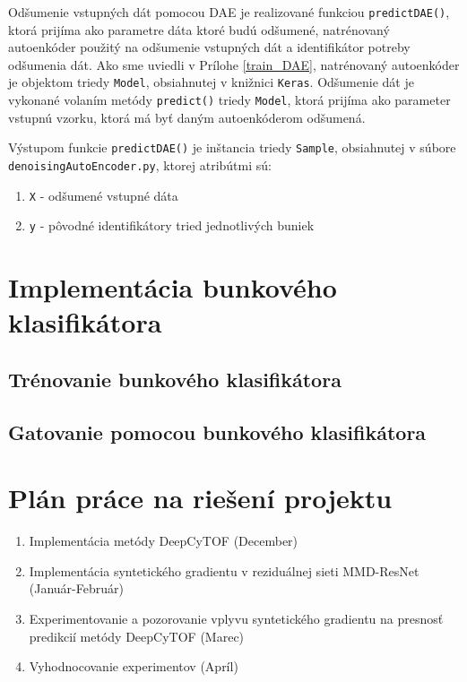 Odšumenie vstupných dát pomocou DAE je realizované funkciou \texttt{predictDAE()}, ktorá prijíma ako parametre dáta ktoré budú odšumené, natrénovaný autoenkóder použitý na odšumenie vstupných dát a identifikátor potreby odšumenia dát. Ako sme uviedli v Prílohe \ref{train_DAE}, natrénovaný autoenkóder je objektom triedy \texttt{Model}, obsiahnutej v knižnici \texttt{Keras}. Odšumenie dát je vykonané volaním metódy \texttt{predict()} triedy \texttt{Model}, ktorá prijíma ako parameter vstupnú vzorku, ktorá má byť daným autoenkóderom odšumená. 

Výstupom funkcie \texttt{predictDAE()} je inštancia triedy \texttt{Sample}, obsiahnutej v súbore \texttt{denoisingAutoEncoder.py}, ktorej atribútmi sú:
\begin{enumerate}
    \item \texttt{X} - odšumené vstupné dáta
    \item \texttt{y} - pôvodné identifikátory tried jednotlivých buniek
\end{enumerate}

\chapter{Implementácia bunkového klasifikátora}
\label{implementation_ff_net}

\section{Trénovanie bunkového klasifikátora}
\label{trainFF}

\section{Gatovanie pomocou bunkového klasifikátora}
\label{gateFF}

\chapter{Plán práce na riešení projektu}
\begin{enumerate}
    \item Implementácia metódy DeepCyTOF (December)
    \item Implementácia syntetického gradientu v reziduálnej sieti MMD-ResNet (Január-Február)
    \item Experimentovanie a pozorovanie vplyvu syntetického gradientu na presnosť predikcií metódy DeepCyTOF (Marec)
    \item Vyhodnocovanie experimentov (Apríl)
\end{enumerate}